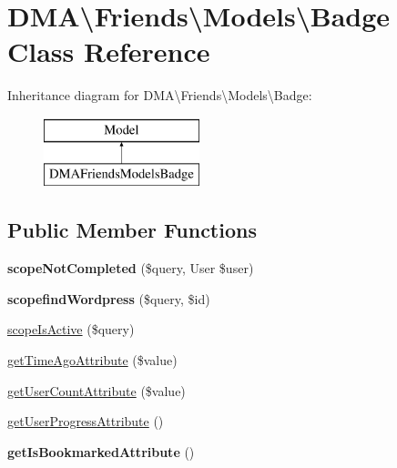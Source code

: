 \hypertarget{classDMA_1_1Friends_1_1Models_1_1Badge}{\section{D\+M\+A\textbackslash{}Friends\textbackslash{}Models\textbackslash{}Badge Class Reference}
\label{classDMA_1_1Friends_1_1Models_1_1Badge}
}
Inheritance diagram for D\+M\+A\textbackslash{}Friends\textbackslash{}Models\textbackslash{}Badge\+:\begin{figure}[H]
\begin{center}
\leavevmode
\includegraphics[height=2.000000cm]{df/d98/classDMA_1_1Friends_1_1Models_1_1Badge}
\end{center}
\end{figure}
\subsection*{Public Member Functions}
\begin{DoxyCompactItemize}
\item 
\hypertarget{classDMA_1_1Friends_1_1Models_1_1Badge_a65fc600bfefbedc8d7393ec86c848a51}{{\bfseries scope\+Not\+Completed} (\$query, User \$user)}\label{classDMA_1_1Friends_1_1Models_1_1Badge_a65fc600bfefbedc8d7393ec86c848a51}

\item 
\hypertarget{classDMA_1_1Friends_1_1Models_1_1Badge_a5ebdc91135362ca2b0225fdb0c965127}{{\bfseries scopefind\+Wordpress} (\$query, \$id)}\label{classDMA_1_1Friends_1_1Models_1_1Badge_a5ebdc91135362ca2b0225fdb0c965127}

\item 
\hyperlink{classDMA_1_1Friends_1_1Models_1_1Badge_a77dd406d08ff5c6727ee497e7e7ea5ed}{scope\+Is\+Active} (\$query)
\item 
\hyperlink{classDMA_1_1Friends_1_1Models_1_1Badge_a628b0da2969e586837ad98fecf12ee71}{get\+Time\+Ago\+Attribute} (\$value)
\item 
\hyperlink{classDMA_1_1Friends_1_1Models_1_1Badge_a5e5972aaa2bf8b8458bd6ddff8ebc576}{get\+User\+Count\+Attribute} (\$value)
\item 
\hyperlink{classDMA_1_1Friends_1_1Models_1_1Badge_a3deecf172b12b43e2f0c0bb7c15a00c3}{get\+User\+Progress\+Attribute} ()
\item 
\hypertarget{classDMA_1_1Friends_1_1Models_1_1Badge_a218e9babbcf0db06e0a83e1079e858b2}{{\bfseries get\+Is\+Bookmarked\+Attribute} ()}\label{classDMA_1_1Friends_1_1Models_1_1Badge_a218e9babbcf0db06e0a83e1079e858b2}

\end{DoxyCompactItemize}
